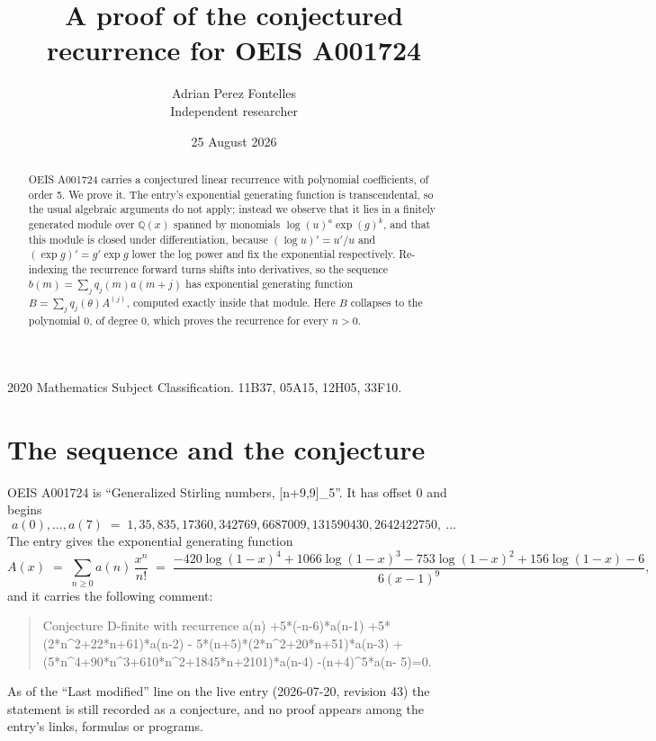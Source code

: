 \documentclass[11pt,a4paper]{article}
\title{A proof of the conjectured recurrence for OEIS A001724}
\author{Adrian Perez Fontelles\\ \small Independent researcher}
\date{25 August 2026}
\theoremstyle{plain}
\theoremstyle{definition}
\begin{document}
\maketitle

\begin{abstract}
OEIS A001724 carries a conjectured linear recurrence with polynomial coefficients, of
order 5. We prove it. The entry's exponential generating function is
transcendental, so the usual algebraic arguments do not apply; instead we observe that it
lies in a finitely generated module over $\mathbb{Q}(x)$ spanned by monomials
$\log(u)^{a}\exp(g)^{k}$, and that this module is closed under differentiation, because
$(\log u)'=u'/u$ and $(\exp g)'=g'\exp g$ lower the log power and fix the exponential
respectively. Re-indexing the recurrence forward turns shifts into derivatives, so the
sequence $b(m)=\sum_{j}q_{j}(m)a(m+j)$ has exponential generating function
$B=\sum_{j}q_{j}(\theta)A^{(j)}$, computed exactly inside that module. Here $B$ collapses
to the polynomial $0$, of degree $0$, which proves the recurrence for every
$n>0$.
\end{abstract}

\noindent\small 2020 Mathematics Subject Classification. 11B37, 05A15, 12H05, 33F10.\normalsize

\section{The sequence and the conjecture}

OEIS A001724 is ``Generalized Stirling numbers, [n+9,9]\_5''. It has offset $0$ and begins
\[
a(0),\dots,a(7)\;=\;1, 35, 835, 17360, 342769, 6687009, 131590430, 2642422750,\ \dots
\]
The entry gives the exponential generating function
\begin{equation}\label{eq:gf}
A(x)\;=\;\sum_{n\ge 0} a(n)\,\frac{x^{n}}{n!}\;=\;\frac{- 420 \log{\left(1 - x \right)}^{4} + 1066 \log{\left(1 - x \right)}^{3} - 753 \log{\left(1 - x \right)}^{2} + 156 \log{\left(1 - x \right)} - 6}{6 \left(x - 1\right)^{9}} ,
\end{equation}
and it carries the following comment:
\begin{quote}\small
Conjecture D-finite with recurrence a(n) +5*(-n-6)*a(n-1) +5*(2*n\textasciicircum{}2+22*n+61)*a(n-2) - 5*(n+5)*(2*n\textasciicircum{}2+20*n+51)*a(n-3) +(5*n\textasciicircum{}4+90*n\textasciicircum{}3+610*n\textasciicircum{}2+1845*n+2101)*a(n-4) -(n+4)\textasciicircum{}5*a(n- 5)=0.
\end{quote}
As of the ``Last modified'' line on the live entry (2026-07-20, revision 43) the
statement is still recorded as a conjecture, and no proof appears among the entry's links,
formulas or programs.
\end{document}
